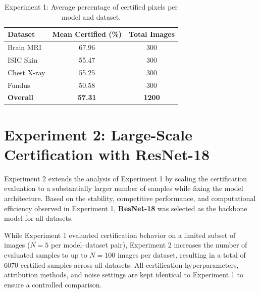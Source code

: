 \documentclass[11pt]{article}
\begin{document}
\begin{table}[h!]
\begin{table}[h!]
\centering
\caption{Experiment 1: Average percentage of certified pixels across datasets (all models combined).}
\label{tab:exp1_dataset_avg}
\begin{tabular}{lcc}
\toprule
\textbf{Dataset} & \textbf{Mean Certified (\%)} & \textbf{Total Images} \\
\midrule
Brain MRI   & 67.96 & 300 \\
ISIC Skin  & 55.47 & 300 \\
Chest X-ray & 55.25 & 300 \\
Fundus     & 50.58 & 300 \\
\midrule
\textbf{Overall} & \textbf{57.31} & \textbf{1200} \\
\bottomrule
\end{tabular}
\end{table}

\begin{table}[h!]
\centering
\caption{Experiment 1: Average percentage of certified pixels per model and dataset.}
\label{tab:exp1_model_avg}
\end{table}

\section{Experiment 2: Large-Scale Certification with ResNet-18}

Experiment 2 extends the analysis of Experiment 1 by scaling the certification evaluation to a substantially larger number of samples while fixing the model architecture. Based on the stability, competitive performance, and computational efficiency observed in Experiment 1, \textbf{ResNet-18} was selected as the backbone model for all datasets.

While Experiment 1 evaluated certification behavior on a limited subset of images ($N=5$ per model–dataset pair), Experiment 2 increases the number of evaluated samples to up to $N=100$ images per dataset, resulting in a total of 6070 certified samples across all datasets. All certification hyperparameters, attribution methods, and noise settings are kept identical to Experiment 1 to ensure a controlled comparison.


\end{table}
\end{document}
